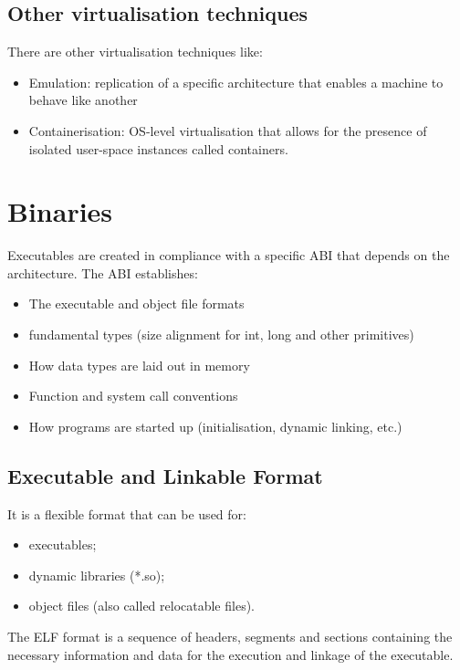 \documentclass[paper=a4, fontsize=11pt]{report} %
\numberwithin{equation}{section} %
\numberwithin{figure}{section} %
\numberwithin{table}{section} %
\begin{document}
\subsection{Other virtualisation techniques}
There are other virtualisation techniques like:
\begin{itemize}
	\item Emulation: replication of a specific architecture that enables a 
	machine to behave like another
	\item Containerisation: OS-level virtualisation that allows for the 
	presence of isolated user-space instances called containers.
\end{itemize}
\section{Binaries}
Executables are created in compliance with a specific ABI that depends on the 
architecture. The ABI establishes:
\begin{itemize}
	\item The executable and object file formats
	\item fundamental types (size alignment for int, long and other primitives)
	\item How data types are laid out in memory
	\item Function and system call conventions
	\item How programs are started up (initialisation, dynamic linking, etc.)
\end{itemize}
\subsection{Executable and Linkable Format}
It is a flexible format that can be used for:
\begin{itemize}
	\item executables;
	\item dynamic libraries (*.so);
	\item object files (also called relocatable files).
\end{itemize}
The ELF format is a sequence of headers, segments and sections containing the 
necessary information and data for the execution and linkage of the executable.
\end{document}
